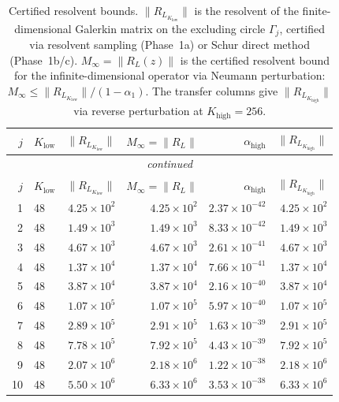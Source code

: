 \documentclass[11pt]{article}
\begin{document}
\begin{longtable}{rlrrrr}
\caption{Certified resolvent bounds.  $\|R_{L_{K_{\mathrm{low}}}}\|$ is the resolvent of the
finite-dimensional Galerkin matrix on the excluding circle $\Gamma_j$, certified via
resolvent sampling (Phase~1a) or Schur direct method (Phase~1b/c).
$M_\infty = \|R_L(z)\|$ is the certified resolvent bound
for the infinite-dimensional operator via Neumann perturbation:
$M_\infty \leq \|R_{L_{K_{\mathrm{low}}}}\| / (1 - \alpha_1)$.
The transfer columns give $\|R_{L_{K_{\mathrm{high}}}}\|$ via reverse perturbation
at $K_{\mathrm{high}} = 256$.}
\label{S-tab:resolvent-bounds}\\
\toprule
$j$ & $K_{\mathrm{low}}$ & $\|R_{L_{K_{\mathrm{low}}}}\|$ & $M_\infty = \|R_L\|$ & $\alpha_{\mathrm{high}}$ & $\|R_{L_{K_{\mathrm{high}}}}\|$ \\
\midrule
\endfirsthead
\multicolumn{6}{c}{\textit{continued}} \\
\toprule
$j$ & $K_{\mathrm{low}}$ & $\|R_{L_{K_{\mathrm{low}}}}\|$ & $M_\infty = \|R_L\|$ & $\alpha_{\mathrm{high}}$ & $\|R_{L_{K_{\mathrm{high}}}}\|$ \\
\midrule
\endhead
1 & 48 & $4.25 \times 10^{2}$ & $4.25 \times 10^{2}$ & $2.37 \times 10^{-42}$ & $4.25 \times 10^{2}$ \\
2 & 48 & $1.49 \times 10^{3}$ & $1.49 \times 10^{3}$ & $8.33 \times 10^{-42}$ & $1.49 \times 10^{3}$ \\
3 & 48 & $4.67 \times 10^{3}$ & $4.67 \times 10^{3}$ & $2.61 \times 10^{-41}$ & $4.67 \times 10^{3}$ \\
4 & 48 & $1.37 \times 10^{4}$ & $1.37 \times 10^{4}$ & $7.66 \times 10^{-41}$ & $1.37 \times 10^{4}$ \\
5 & 48 & $3.87 \times 10^{4}$ & $3.87 \times 10^{4}$ & $2.16 \times 10^{-40}$ & $3.87 \times 10^{4}$ \\
6 & 48 & $1.07 \times 10^{5}$ & $1.07 \times 10^{5}$ & $5.97 \times 10^{-40}$ & $1.07 \times 10^{5}$ \\
7 & 48 & $2.89 \times 10^{5}$ & $2.91 \times 10^{5}$ & $1.63 \times 10^{-39}$ & $2.91 \times 10^{5}$ \\
8 & 48 & $7.78 \times 10^{5}$ & $7.92 \times 10^{5}$ & $4.43 \times 10^{-39}$ & $7.92 \times 10^{5}$ \\
9 & 48 & $2.07 \times 10^{6}$ & $2.18 \times 10^{6}$ & $1.22 \times 10^{-38}$ & $2.18 \times 10^{6}$ \\
10 & 48 & $5.50 \times 10^{6}$ & $6.33 \times 10^{6}$ & $3.53 \times 10^{-38}$ & $6.33 \times 10^{6}$ \\

\end{longtable}
\end{document}
